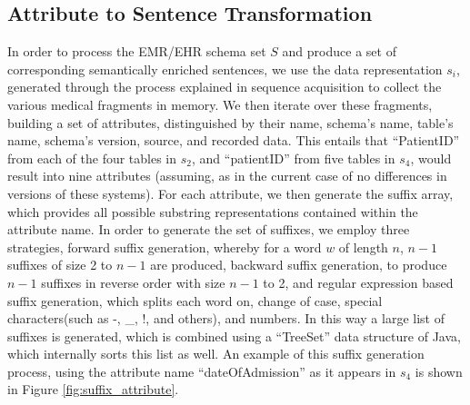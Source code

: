 \documentclass{ieeeaccess}
\begin{document}
\subsection{Attribute to Sentence Transformation}
\label{schema_prepro}
In order to process the EMR/EHR schema set $S$ and produce a set of corresponding semantically enriched sentences, we use the data representation $s_i$, generated through the process explained in sequence acquisition to collect the various medical fragments in memory. We then iterate over these fragments, building a set of attributes, distinguished by their name, schema's name, table's name, schema's version, source, and recorded data. This entails that ``PatientID'' from each of the four tables in $s_2$, and ``patientID'' from five tables in $s_4$, would result into nine attributes (assuming, as in the current case of no differences in versions of these systems).
For each attribute, we then generate the suffix array, which provides all possible substring representations contained within the attribute name. In order to generate the set of suffixes, we employ three strategies, forward suffix generation, whereby for a word $w$ of length $n$, $n-1$ suffixes of size 2 to $n-1$ are produced, backward suffix generation, to produce $n-1$ suffixes in reverse order with size $n-1$ to 2, and regular expression based suffix generation, which splits each word on, change of case, special characters(such as -, \_, !, and others), and numbers. In this way a large list of suffixes is generated, which is combined using a ``TreeSet'' data structure of Java, which internally sorts this list as well. An example of this suffix generation process, using the attribute name ``dateOfAdmission'' as it appears in $s_4$ is shown in Figure \ref{fig:suffix_attribute}.
\end{document}
